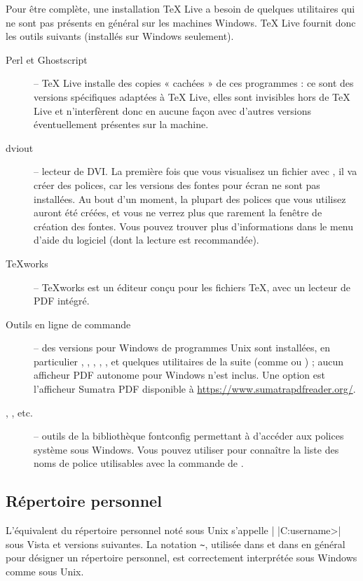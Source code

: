 \documentclass[german, english, french]{article}
\renewcommand{\TL}{\TeX{} Live\xspace}%
\begin{document}
Pour être complète, une installation \TL a besoin de quelques utilitaires qui ne
sont pas présents en général sur les machines Windows. \TL fournit donc les
outils suivants (installés sur Windows seulement).
\begin{description}
\item[Perl et Ghostscript] -- \TL{} installe des copies « cachées » de ces
  programmes : ce sont des versions spécifiques adaptées à \TL{}, elles sont
  invisibles hors de \TL{} et n'interfèrent donc en aucune façon avec d'autres
  versions éventuellement présentes sur la machine.

\item[dviout] -- lecteur de DVI. La première fois que vous visualisez un fichier
  avec , il va créer des polices, car les versions des fontes pour
  écran ne sont pas installées. Au bout d'un moment, la plupart des polices que
  vous utilisez auront été créées, et vous ne verrez plus que rarement la
  fenêtre de création des fontes. Vous pouvez trouver plus d'informations dans
  le menu d'aide du logiciel (dont la lecture est recommandée).

\item[\TeX{}works] -- \TeX{}works est un éditeur conçu pour les fichiers \TeX,
  avec un lecteur de PDF intégré.

\item[Outils en ligne de commande] -- des versions pour Windows de programmes
  Unix sont installées, en particulier , ,
  , , ,  et
  quelques utilitaires de la suite  (comme  ou
  ) ; aucun afficheur PDF autonome pour Windows n'est
  inclus. Une option est l'afficheur Sumatra PDF disponible
  à \url{https://www.sumatrapdfreader.org/}.
\item[, , etc.] -- outils de la bibliothèque
  fontconfig permettant à \XeTeX{} d'accéder aux polices système sous
  Windows. Vous pouvez utiliser  pour connaître la liste des noms
  de police utilisables avec la commande  de \XeTeX.
\end{description}

\subsection{Répertoire personnel}
\label{sec:winhome}

L'équivalent du répertoire personnel noté  sous Unix s'appelle
|%
|C:\Utilisateurs\<username>| sous Vista et versions suivantes.  La notation
\verb|~|, utilisée dans  et dans \KPS{} en général pour
désigner un répertoire personnel, est correctement interprétée sous Windows
comme sous Unix.
\end{document}
